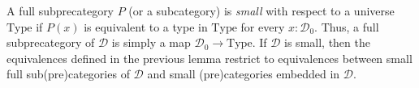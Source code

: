 \documentclass[reqno]{amsart}
\theoremstyle{definition}
\theoremstyle{remark}
\newcommand{\fs}[1]{\mathrm{#1}}
\newcommand{\scat}[1]{\mathcal{#1}}
\newcommand{\uType}{\fs{Type}}
\newcommand{\ob}[1]{#1_0}
\newcommand{\Prop}{\fs{Prop}}
\newcommand{\El}{\fs{El}}
\numberwithin{figure}{section}
\begin{document}
A full subprecategory $P$ (or a subcategory) is \emph{small} with respect to a universe $\uType$ if $P(x)$ is equivalent to a type in $\uType$ for every $x : \ob{\scat{D}}$.
Thus, a full subprecategory of $\scat{D}$ is simply a map $\ob{\scat{D}} \to \uType$.
If $\scat{D}$ is small, then the equivalences defined in the previous lemma restrict to equivalences between small full sub(pre)categories of $\scat{D}$ and small (pre)categories embedded in $\scat{D}$.




\end{document}
